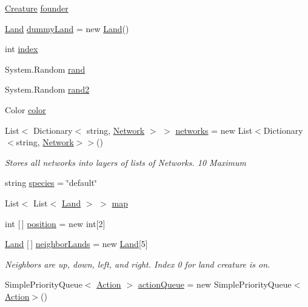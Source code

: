 \begin{DoxyCompactItemize}
\item 
\mbox{\hyperlink{class_creature}{Creature}} \mbox{\hyperlink{class_creature_ab689ebff012f90395825a404bd6990c6}{founder}}
\item 
\mbox{\hyperlink{class_land}{Land}} \mbox{\hyperlink{class_creature_a08982d1959e230238389a1a5e9853115}{dummy\+Land}} = new \mbox{\hyperlink{class_land}{Land}}()
\item 
int \mbox{\hyperlink{class_creature_a358feda4f0a406a8f28bed6acb170c37}{index}}
\item 
System.\+Random \mbox{\hyperlink{class_creature_ab3b01072caf7d87c396a2d80a3d73412}{rand}}
\item 
System.\+Random \mbox{\hyperlink{class_creature_a08184ad607f5105788e09e8501386da0}{rand2}}
\item 
Color \mbox{\hyperlink{class_creature_a4f2289e79c2db01559984c8797a322c8}{color}}
\item 
List$<$ Dictionary$<$ string, \mbox{\hyperlink{class_network}{Network}} $>$ $>$ \mbox{\hyperlink{class_creature_a1caf157811e3a3b37f9b292560aa0552}{networks}} = new List$<$Dictionary$<$string, \mbox{\hyperlink{class_network}{Network}}$>$$>$()
\begin{DoxyCompactList}\small\item\em Stores all networks into layers of lists of Networks. 10 Maximum \end{DoxyCompactList}\item 
string \mbox{\hyperlink{class_creature_a721fb38fcd0d2e7bfc307a6921e3fa2e}{species}} = \char`\"{}default\char`\"{}
\item 
List$<$ List$<$ \mbox{\hyperlink{class_land}{Land}} $>$ $>$ \mbox{\hyperlink{class_creature_ac96bc7e8b95322eeaadf280d715f738a}{map}}
\item 
int \mbox{[}$\,$\mbox{]} \mbox{\hyperlink{class_creature_ab6036649791244250e257da28733b2e7}{position}} = new int\mbox{[}2\mbox{]}
\item 
\mbox{\hyperlink{class_land}{Land}} \mbox{[}$\,$\mbox{]} \mbox{\hyperlink{class_creature_a6b427ac086b4cca5ed85553942e01d71}{neighbor\+Lands}} = new \mbox{\hyperlink{class_land}{Land}}\mbox{[}5\mbox{]}
\begin{DoxyCompactList}\small\item\em Neighbors are up, down, left, and right. Index 0 for land creature is on. \end{DoxyCompactList}\item 
Simple\+Priority\+Queue$<$ \mbox{\hyperlink{class_action}{Action}} $>$ \mbox{\hyperlink{class_creature_abb099197e9fa2dac396151e4e949214d}{action\+Queue}} = new Simple\+Priority\+Queue$<$\mbox{\hyperlink{class_action}{Action}}$>$()
$$
\end{DoxyCompactItemize}
